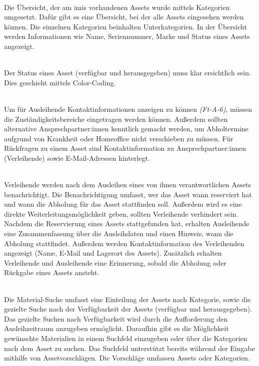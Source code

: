     {\sffamily\color{maincolor}{Ft-VA-2 | Übersicht über ausleihbare Assets }}\\
Die Übersicht, der am \ac{imis} vorhandenen Assets wurde mittels Kategorien
umgesetzt. Dafür gibt es eine Übersicht, bei der alle Assets eingesehen werden
können. Die einzelnen Kategorien beinhalten Unterkategorien. In der Übersicht
werden Informationen wie Name, Seriennummer, Marke und Status eines Assets
angezeigt.

    {\sffamily\color{maincolor}{Ft-VA-3 |  Verfügbarkeit von Assets }}\\
Der Status eines Asset (verfügbar und herausgegeben) muss klar ersichtlich
sein. Dies geschieht mittels Color-Coding.  


{\sffamily\color{maincolor}{Ft-VA-4 | Zuständigkeitsbereich }}\\
Um für Ausleihende Kontaktinformationen anzeigen zu können \textit{(Ft-A-6)},
müssen die Zuständigkeitsbereiche eingetragen werden können. Außerdem sollten
alternative Ansprechpartner:innen kenntlich gemacht werden, um Abholtermine
aufgrund von Krankheit oder Homeoffice nicht verschieben zu müssen. Für
Rückfragen zu einem Asset sind Kontaktinformation zu Ansprechpartner:innen
(Verleihende) sowie E-Mail-Adressen hinterlegt.

    {\sffamily\color{maincolor}{Ft-VA-5 | Benachrichtigungen \& Erinnerungen
        }}\\
Verleihende werden nach dem Ausleihen eines von ihnen verantwortlichen Assets
benachrichtigt. Die Benachrichtigung umfasst, wer das Asset wann reserviert hat
und wann die Abholung für das Asset stattfinden soll. Außerdem wird es eine
direkte Weiterleitungsmöglichkeit geben, sollten Verleihende verhindert sein.
Nachdem die Reservierung eines Assets stattgefunden hat, erhalten Ausleihende
eine Zusammenfassung über die Ausleihdaten und einen Hinweis, wann die Abholung
stattfindet. Außerdem werden Kontaktinformation des Verleihenden angezeigt
(Name, E-Mail und Lagerort des Assets). Zusätzlich erhalten Verleihende und
Ausleihende eine Erinnerung, sobald die Abholung oder Rückgabe eines Assets
ansteht.


    {\sffamily\color{maincolor}{Ft-VA-6 | Material-Suche }}\\
Die Material-Suche umfasst eine Einteilung der Assets nach Kategorie, sowie die gezielte Suche nach
der Verfügbarkeit der Assets (verfügbar und herausgegeben). Das gezielte Suchen nach Verfügbarkeit
wird durch die Aufforderung den Ausleihzeitraum anzugeben ermöglicht. Daraufhin gibt es die
Möglichkeit gewünschte Materialien in einem Suchfeld einzugeben oder über die Kategorien nach dem
Asset zu suchen. Das Suchfeld unterstützt bereits während der Eingabe mithilfe von Assetvorschlägen.
Die Vorschläge umfassen Assets oder Kategorien.


